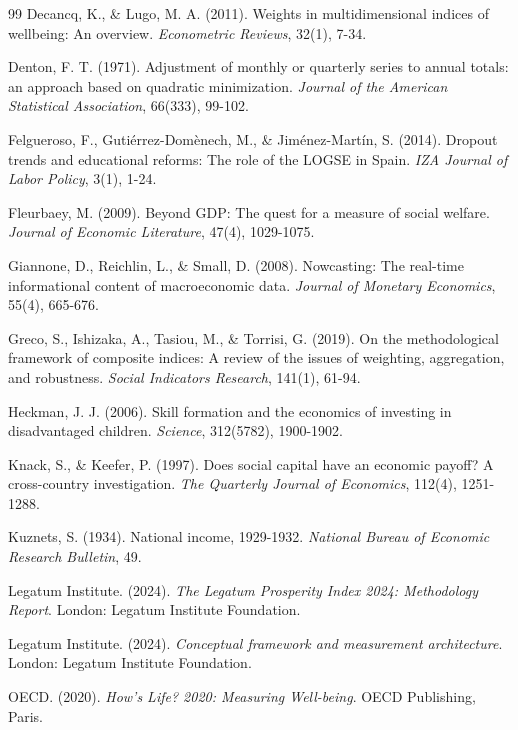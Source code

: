 \documentclass[authoryear,12pt]{elsarticle}
\begin{document}
\begin{thebibliography}{99}
Decancq, K., \& Lugo, M. A. (2011).
Weights in multidimensional indices of wellbeing: An overview.
\textit{Econometric Reviews}, 32(1), 7-34.

Denton, F. T. (1971).
Adjustment of monthly or quarterly series to annual totals: an approach based on quadratic minimization.
\textit{Journal of the American Statistical Association}, 66(333), 99-102.

Felgueroso, F., Gutiérrez-Domènech, M., \& Jiménez-Martín, S. (2014).
Dropout trends and educational reforms: The role of the LOGSE in Spain.
\textit{IZA Journal of Labor Policy}, 3(1), 1-24.

Fleurbaey, M. (2009).
Beyond GDP: The quest for a measure of social welfare.
\textit{Journal of Economic Literature}, 47(4), 1029-1075.

Giannone, D., Reichlin, L., \& Small, D. (2008).
Nowcasting: The real-time informational content of macroeconomic data.
\textit{Journal of Monetary Economics}, 55(4), 665-676.

Greco, S., Ishizaka, A., Tasiou, M., \& Torrisi, G. (2019).
On the methodological framework of composite indices: A review of the issues of weighting, aggregation, and robustness.
\textit{Social Indicators Research}, 141(1), 61-94.

Heckman, J. J. (2006).
Skill formation and the economics of investing in disadvantaged children.
\textit{Science}, 312(5782), 1900-1902.

Knack, S., \& Keefer, P. (1997).
Does social capital have an economic payoff? A cross-country investigation.
\textit{The Quarterly Journal of Economics}, 112(4), 1251-1288.

Kuznets, S. (1934).
National income, 1929-1932.
\textit{National Bureau of Economic Research Bulletin}, 49.

Legatum Institute. (2024).
\textit{The Legatum Prosperity Index 2024: Methodology Report}.
London: Legatum Institute Foundation.

Legatum Institute. (2024).
\textit{Conceptual framework and measurement architecture}.
London: Legatum Institute Foundation.

OECD. (2020).
\textit{How's Life? 2020: Measuring Well-being}.
OECD Publishing, Paris.


\end{thebibliography}
\end{document}

